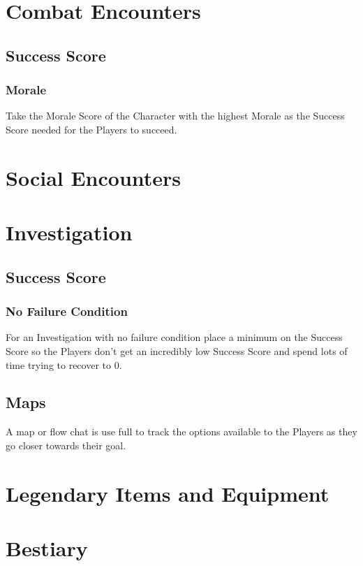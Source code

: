 \documentclass[a4paper,12pt,oneside]{book}
\begin{document}
        \section{Combat Encounters}
            \subsection{Success Score}
                \subsubsection{Morale}
                    Take the Morale Score of the Character with the highest Morale as the Success Score needed for the Players to succeed.
        \section{Social Encounters}

        \section{Investigation}
            \subsection{Success Score}
                \subsubsection{No Failure Condition}
                    For an Investigation with no failure condition place a minimum on the Success Score so the Players don't get an incredibly low Success Score and spend lots of time trying to recover to 0.

            \subsection{Maps}
                A map or flow chat is use full to track the options available to the Players as they go closer towards their goal.

        \section{Legendary Items and Equipment}
        \section{Bestiary}




    \appendix

    \backmatter
    {}
    
    \printindex
\end{document}
